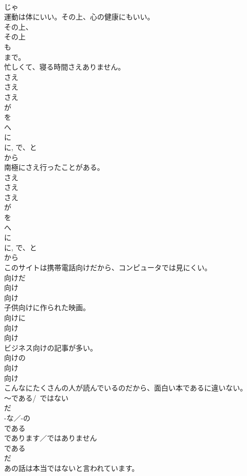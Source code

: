 \documentclass[8pt]{extreport}
\begin{document}
\begin{CJK}{UTF8}{min}
{\\	じゃ 
\\	運動は体にいい。その上、心の健康にもいい。	
\\	その上、
\\	その上 
\\	も 
\\	まで。 
\\	忙しくて、寝る時間さえありません。	
\\	さえ 
\\	さえ 
\\	さえ 
\\	が 
\\	を 
\\	へ 
\\	に 
\\	に, で、と 
\\	から 
\\	南極にさえ行ったことがある。	
\\	さえ 
\\	さえ 
\\	さえ 
\\	が 
\\	を 
\\	へ 
\\	に 
\\	に, で、と 
\\	から 
\\	このサイトは携帯電話向けだから、コンピュータでは見にくい。	
\\	向けだ 
\\	向け 
\\	向け 
\\	子供向けに作られた映画。	
\\	向けに　
\\	向け 
\\	向け 
\\	ビジネス向けの記事が多い。	
\\	向けの 
\\	向け 
\\	向け 
\\	こんなにたくさんの人が読んでいるのだから、面白い本であるに違いない。	
\\	〜である/~ではない 
\\	だ 
\\	-な／-の 
\\	である 
\\	であります／ではありません 
\\	である 
\\	だ 
\\	あの話は本当ではないと言われています。	
}
\end{CJK}
\end{document}
